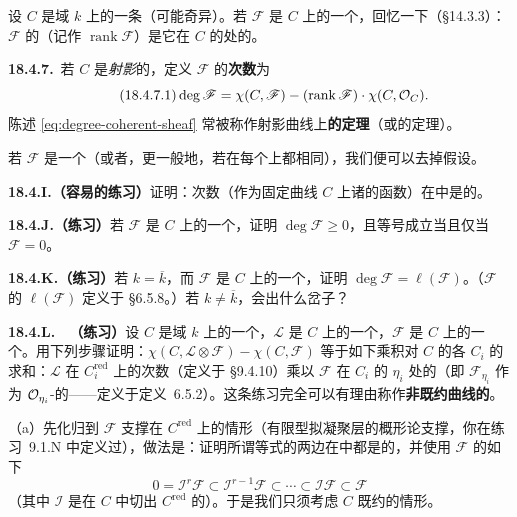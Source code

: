 设 $C$ 是域 $k$ 上的一条\trIrreducible\trReduced{}\trCurve（可能奇异）。若 $\mathscr{F}$ 是 $C$ 上的一个\trCoherentSheaf，回忆一下（\S14.3.3）：$\mathscr{F}$ 的\emph{\trRank}（记作 $\operatorname{rank}\mathscr{F}$）是它在 $C$ 的\trGenericPoint{}处的\trRank。

\textbf{18.4.7.}\ \emph{}\quad 若 $C$ 是\emph{射影}的，定义 $\mathscr{F}$ 的\textbf{次数}为
\begin{equation*}\tag{18.4.7.1}\label{eq:degree-coherent-sheaf}
\deg\mathscr{F}=\chi(C,\mathscr{F})-(\operatorname{rank}\mathscr{F})\cdot\chi(C,\mathcal{O}_C).
\end{equation*}
陈述 \eqref{eq:degree-coherent-sheaf} 常被称作射影曲线上\textbf{\trCoherentSheaf{}的\trRiemannRoch{}定理}（或\trVectorBundle{}的\trRiemannRoch{}定理）。

若 $\mathscr{F}$ 是一个\trInvertibleSheaf（或者，更一般地，若\trRank{}在每个\trIrreducibleComponent{}上都相同），我们便可以去掉\trIrreducibility{}假设。

\textbf{18.4.I.（容易的练习）}\quad 证明：次数（作为固定曲线 $C$ 上诸\trCoherentSheaf{}的函数）在\trExactSequence{}中是\trAdditive{}的。

\textbf{18.4.J.（练习）}\quad 若 $\mathscr{F}$ 是 $C$ 上的一个\trTorsion\trSheaf，证明 $\deg\mathscr{F}\ge 0$，且等号成立当且仅当 $\mathscr{F}=0$。

\textbf{18.4.K.（练习）}\quad 若 $k=\overline{k}$，而 $\mathscr{F}$ 是 $C$ 上的一个\trTorsion\trSheaf，证明 $\deg\mathscr{F}=\ell(\mathscr{F})$。（$\mathscr{F}$ 的\trLength{} $\ell(\mathscr{F})$ 定义于 \S6.5.8。）若 $k\ne\overline{k}$，会出什么岔子？

\textbf{18.4.L.}\ \hard\ \textbf{（练习）}\quad 设 $C$ 是域 $k$ 上的一个\trProjective{}\trCurve，$\mathscr{L}$ 是 $C$ 上的一个\trLineBundle，$\mathscr{F}$ 是 $C$ 上的一个\trCoherentSheaf。用下列步骤证明：$\chi(C,\mathscr{L}\otimes\mathscr{F})-\chi(C,\mathscr{F})$ 等于如下乘积对 $C$ 的各\trIrreducibleComponent{} $C_i$ 的求和：$\mathscr{L}$ 在 $C_i^{\mathrm{red}}$ 上的次数（\trReduction{}定义于 \S9.4.10）乘以 $\mathscr{F}$ 在 $C_i$ 的\trGenericPoint{} $\eta_i$ 处的\trLength（即 $\mathscr{F}_{\eta_i}$ 作为 $\mathcal{O}_{\eta_i}$-\trModule{}的\trLength——\trLength{}定义于\mbox{定义~6.5.2}）。这条练习完全可以有理由称作\textbf{非既约曲线的\trRiemannRoch}。

（a）先化归到 $\mathscr{F}$ \trSchemeTheoretic{}支撑在 $C^{\mathrm{red}}$ 上的情形（有限型拟凝聚层的概形论支撑，你在\mbox{练习~9.1.N} 中定义过），做法是：证明所谓等式的两边在\trShortExactSequence{}中都是\trAdditive{}的，并使用 $\mathscr{F}$ 的如下\trFiltration
\[
0=\mathscr{I}^r\mathscr{F}\subset\mathscr{I}^{r-1}\mathscr{F}\subset\cdots\subset\mathscr{I}\mathscr{F}\subset\mathscr{F}
\]
（其中 $\mathscr{I}$ 是在 $C$ 中切出 $C^{\mathrm{red}}$ 的\trIdealSheaf）。于是我们只须考虑 $C$ 既约的情形。

